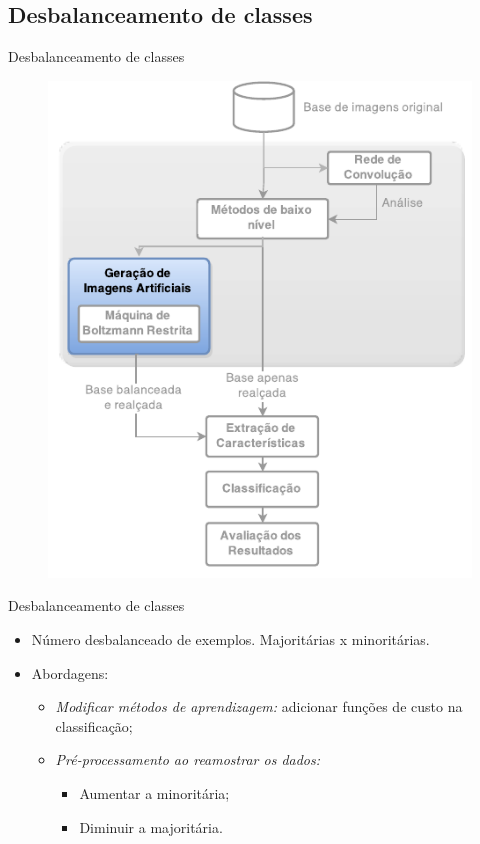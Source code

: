 \documentclass{beamer}
\begin{document}
\subsection{Desbalanceamento de classes}
\begin{frame}{Desbalanceamento de classes}
\begin{figure}
    \includegraphics[height=0.75\textheight]{figuras/geral_geracao.pdf}
\end{figure}
\end{frame}
\begin{frame}{Desbalanceamento de classes}
\setlength\leftmargini{0em}
\justifying
{}
\begin{itemize}
  \item Número desbalanceado de exemplos. Majoritárias x minoritárias.
  \item Abordagens:
    \begin{itemize}
        \item \emph{Modificar métodos de aprendizagem:} adicionar funções de custo na classificação;
        \item \emph{Pré-processamento ao reamostrar os dados:}
      \begin{itemize}
          \item Aumentar a minoritária;
          \item Diminuir a majoritária.
      \end{itemize}
    \end{itemize}
\end{itemize}
\end{frame}
\end{document}
